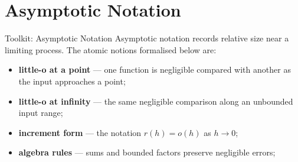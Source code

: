 \section{Asymptotic Notation}
\label{sec:asymptotic-notation}

\begin{toolkitbox}{Toolkit: Asymptotic Notation}
Asymptotic notation records relative size near a limiting process. The atomic
notions formalised below are:
\begin{itemize}
  \item \textbf{little-o at a point} --- one function is negligible compared
        with another as the input approaches a point;
  \item \textbf{little-o at infinity} --- the same negligible comparison along
        an unbounded input range;
  \item \textbf{increment form} --- the notation $r(h)=o(h)$ as $h\to 0$;
  \item \textbf{algebra rules} --- sums and bounded factors preserve
        negligible errors;
\end{itemize}
\end{toolkitbox}


